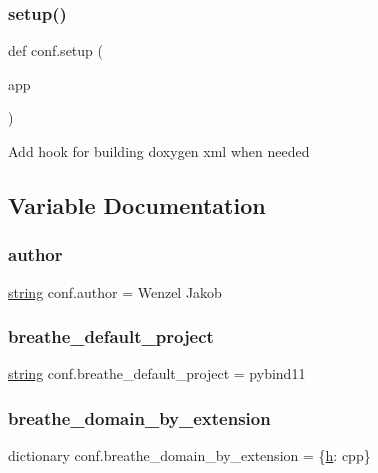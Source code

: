 \subsubsection{\texorpdfstring{setup()}{setup()}}
{\footnotesize\ttfamily def conf.\+setup (\begin{DoxyParamCaption}\item[{}]{app }\end{DoxyParamCaption})}

\begin{DoxyVerb}Add hook for building doxygen xml when needed\end{DoxyVerb}
 

\subsection{Variable Documentation}
\mbox{\label{namespaceconf_a637c239d256432248aa8d9f3ab0b8c52}} 
\subsubsection{\texorpdfstring{author}{author}}
{\footnotesize\ttfamily \mbox{\hyperlink{asdl_8h_ae84541b4f3d8e1ea24ec0f466a8c568b}{string}} conf.\+author = \textquotesingle{}Wenzel Jakob\textquotesingle{}}

\mbox{\label{namespaceconf_a6eba2d2c7ae923054b1c49e686ec89b9}} 
\subsubsection{\texorpdfstring{breathe\_default\_project}{breathe\_default\_project}}
{\footnotesize\ttfamily \mbox{\hyperlink{asdl_8h_ae84541b4f3d8e1ea24ec0f466a8c568b}{string}} conf.\+breathe\+\_\+default\+\_\+project = \textquotesingle{}pybind11\textquotesingle{}}

\mbox{\label{namespaceconf_a21389186546df811dd31aca1f16f8f5f}} 
\subsubsection{\texorpdfstring{breathe\_domain\_by\_extension}{breathe\_domain\_by\_extension}}
{\footnotesize\ttfamily dictionary conf.\+breathe\+\_\+domain\+\_\+by\+\_\+extension = \{\textquotesingle{}\mbox{\hyperlink{_s_d_l__opengl__glext_8h_afa0fb1b5e976920c0abeff2dca3ed774}{h}}\textquotesingle{}\+: \textquotesingle{}cpp\textquotesingle{}\}}

